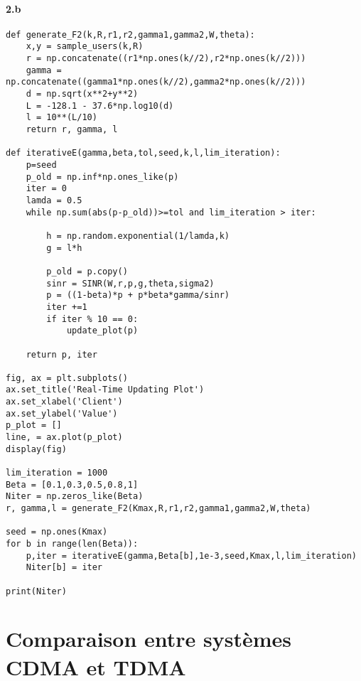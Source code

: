 \documentclass[a4paper,11pt,2]{article}
\begin{document}
\paragraph{2.b}
\begin{center}
\begin{lstlisting}
def generate_F2(k,R,r1,r2,gamma1,gamma2,W,theta):
    x,y = sample_users(k,R)
    r = np.concatenate((r1*np.ones(k//2),r2*np.ones(k//2)))
    gamma = np.concatenate((gamma1*np.ones(k//2),gamma2*np.ones(k//2)))
    d = np.sqrt(x**2+y**2)
    L = -128.1 - 37.6*np.log10(d)
    l = 10**(L/10)
    return r, gamma, l

def iterativeE(gamma,beta,tol,seed,k,l,lim_iteration):
    p=seed
    p_old = np.inf*np.ones_like(p)
    iter = 0
    lamda = 0.5
    while np.sum(abs(p-p_old))>=tol and lim_iteration > iter:

        h = np.random.exponential(1/lamda,k)
        g = l*h

        p_old = p.copy()
        sinr = SINR(W,r,p,g,theta,sigma2)
        p = ((1-beta)*p + p*beta*gamma/sinr)
        iter +=1
        if iter % 10 == 0:
            update_plot(p)
        
    return p, iter

fig, ax = plt.subplots()
ax.set_title('Real-Time Updating Plot')
ax.set_xlabel('Client')
ax.set_ylabel('Value')
p_plot = []
line, = ax.plot(p_plot)
display(fig)

lim_iteration = 1000
Beta = [0.1,0.3,0.5,0.8,1]
Niter = np.zeros_like(Beta)
r, gamma,l = generate_F2(Kmax,R,r1,r2,gamma1,gamma2,W,theta)

seed = np.ones(Kmax)
for b in range(len(Beta)):
    p,iter = iterativeE(gamma,Beta[b],1e-3,seed,Kmax,l,lim_iteration)
    Niter[b] = iter

print(Niter)
\end{lstlisting}
\end{center}

\section{Comparaison entre systèmes CDMA et TDMA}
\end{document}
